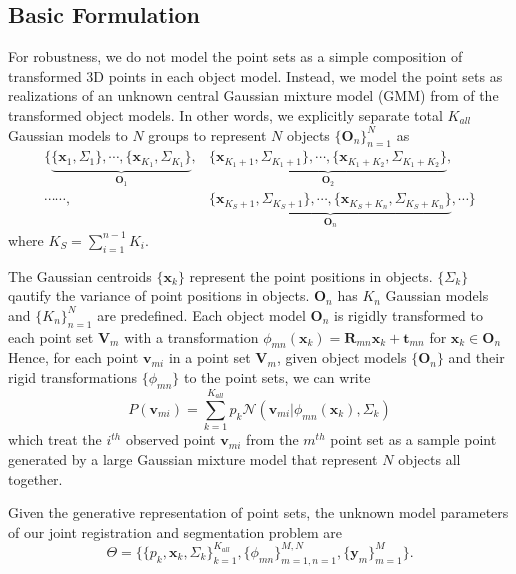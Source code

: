 \subsection{Basic Formulation}
For robustness, we do not model the point sets as a simple composition of transformed 3D points in each object model. Instead, we model the point sets as realizations of an unknown central Gaussian mixture model (GMM) from of the transformed object models. In other words, we explicitly separate total $K_{all}$ Gaussian models to $N$ groups to represent $N$ objects $\{\mathbf{O}_n\}_{n=1}^N$ as
\begin{equation}
\begin{aligned}
\{
\underbrace{ \{\pmb{x}_{1},\Sigma_{1}\}, \cdots, \{\pmb{x}_{K_1},\Sigma_{K_1}\}  }_{\mathbf{O}_1},&\underbrace{ \{\pmb{x}_{K_1+1},\Sigma_{K_1+1}\}, \cdots, \{\pmb{x}_{K_1+K_2},\Sigma_{K_1+K_2}\}  }_{\mathbf{O}_2},\\ 
\cdots \cdots,& 
\underbrace{ \{\pmb{x}_{K_S+1},\Sigma_{K_S+1}\},\cdots,\{\pmb{x}_{K_S+K_n},\Sigma_{K_S+K_n}\}  }_{\mathbf{O}_n},\cdots \}
\end{aligned}
\end{equation}
where $K_S = \sum_{i=1}^{n-1}K_i$.

The Gaussian centroids $\{\pmb{x}_{k}\}$ represent the point positions in objects. $\{\Sigma_{k}\}$ qautify the variance of point positions in objects. $\mathbf{O}_n$ has $K_n$ Gaussian models and $\{K_n\}_{n=1}^N$ are predefined.
Each object model $\mathbf{O}_{n}$ is rigidly transformed to each point set $\mathbf{V}_m$ with a transformation $\phi_{mn}(\pmb{x}_{k})=\mathbf{R}_{mn}\pmb{x}_{k}+\pmb{t}_{mn}$ for $\pmb{x}_{k} \in \mathbf{O}_n$
%
Hence, for each point $\pmb{v}_{mi}$ in a point set $\mathbf{V}_m$, given object models $\{\mathbf{O}_{n}\}$ and their rigid transformations $\{\phi_{mn}\}$ to the point sets, we can write
\begin{equation}
\label{equ:model}
P(\pmb{v}_{mi})=\sum^{K_{all}}_{k=1}p_k\mathcal{N}(\pmb{v}_{mi}|\phi_{mn}(\pmb{x}_k),\Sigma_k)
\end{equation}
which treat the $i^{th}$ observed point $\pmb{v}_{mi}$ from the $m^{th}$ point set as a sample point generated by a large Gaussian mixture model that represent $N$ objects all together.

Given the generative representation of point sets, the unknown model parameters of our joint registration and segmentation problem are
%
\begin{equation}
\varTheta=\big \{\{p_k,\pmb{x}_{k},\Sigma_k\}_{k=1}^{K_{all}},\{\phi_{mn}\}_{m=1,n=1}^{M,N}, \{\pmb{y}_{m}\}^{M}_{m=1}\big\}.
\end{equation}
 
